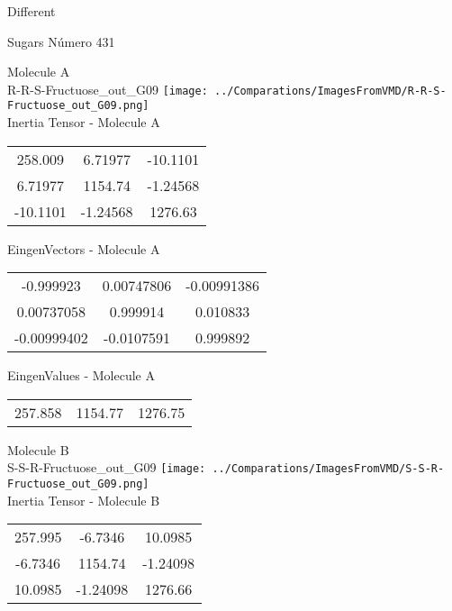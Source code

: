 \begin{center}
\vtab
\vtab
\textcolor{NavyBlue}{\Large Different}
\end{center}

 \newpage

\vtab[-2cm]
\begin{center}
{\large Sugars \tab Número 431}
\end{center}
\begin{multicols}{2}
\begin{center}

Molecule A \\ 
R-R-S-Fructuose\_out\_G09
\texttt{[image: ../Comparations/ImagesFromVMD/R-R-S-Fructuose\_out\_G09.png]}
\\
Inertia Tensor - Molecule A \\
\vtab

\begin{tabular}{|c c c|}
258.009	 & 	6.71977	 & 	-10.1101	 \\
6.71977	 & 	1154.74	 & 	-1.24568	 \\
-10.1101	 & 	-1.24568	 & 	1276.63
\end{tabular}

\vtab
 EingenVectors - Molecule A     \\
\vtab
\begin{tabular}{|c c c|}
-0.999923	 & 	0.00747806	 & 	-0.00991386	 \\
0.00737058	 & 	0.999914	 & 	0.010833	 \\
-0.00999402	 & 	-0.0107591	 & 	0.999892
\end{tabular}

\vtab
 EingenValues - Molecule A     \\
\vtab
\begin{tabular}{|c c c|}
257.858	 & 	1154.77	 & 	1276.75	 \\
\end{tabular}
\columnbreak

Molecule B \\ 
S-S-R-Fructuose\_out\_G09
\texttt{[image: ../Comparations/ImagesFromVMD/S-S-R-Fructuose\_out\_G09.png]}
\\
Inertia Tensor - Molecule B \\
\vtab

\begin{tabular}{|c c c|}
257.995	 & 	-6.7346	 & 	10.0985	 \\
-6.7346	 & 	1154.74	 & 	-1.24098	 \\
10.0985	 & 	-1.24098	 & 	1276.66
\end{tabular}


\end{center}
\end{multicols}
